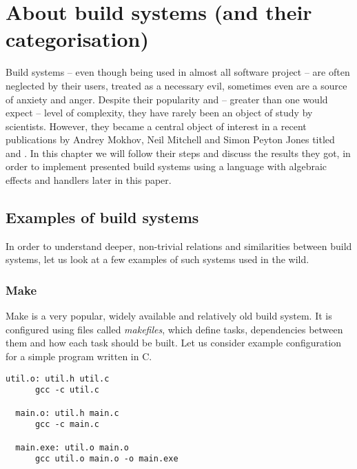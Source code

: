 
\newcommand{\inl}[1]{\lstinline[style=haskell-inl]{#1}}

\chapter{About build systems (and their categorisation)}
\label{chapter-bsalc}

Build systems -- even though being used in almost all software project -- are often neglected by their users, treated as a necessary evil, sometimes even are a source of anxiety and anger. Despite their popularity and -- greater than one would expect -- level of complexity, they have rarely been an object of study by scientists. However, they became a central object of interest in a recent publications by Andrey Mokhov, Neil Mitchell and Simon Peyton Jones titled \BSaLC\cite{mokhov2018build} and \BSaLCTP\cite{mokhov2020build}. In this chapter we will follow their steps and discuss the results they got, in order to implement presented build systems using a language with algebraic effects and handlers later in this paper.

\section{Examples of build systems}

In order to understand deeper, non-trivial relations and similarities between build systems, let us look at a few examples of such systems used in the wild.

\subsection{Make}

Make is a very popular, widely available and relatively old build system. It is configured using files called \textit{makefiles}, which define tasks, dependencies between them and how each task should be built. Let us consider example configuration for a simple program written in C.

\pagebreak

\lstset{language=make}

\begin{lstlisting}[basicstyle=\scriptsize\ttfamily, float=h, title={Example configuration for Make}]
  util.o: util.h util.c
      gcc -c util.c

  main.o: util.h main.c
      gcc -c main.c

  main.exe: util.o main.o
      gcc util.o main.o -o main.exe
\end{lstlisting}

